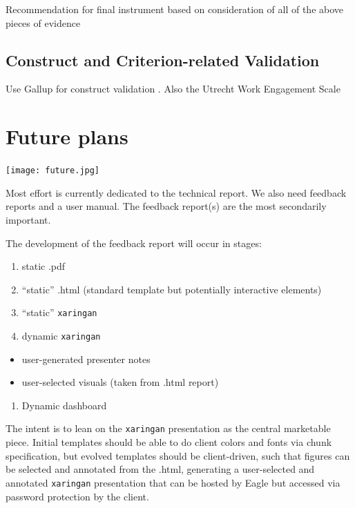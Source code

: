 \documentclass[
]{book}
\providecommand{\tightlist}{%
  \setlength{\itemsep}{0pt}\setlength{\parskip}{0pt}}
\begin{document}
Recommendation for final instrument based on consideration of all of the above pieces of evidence

\hypertarget{construct-and-criterion-related-validation}{%
\section{Construct and Criterion-related Validation}\label{construct-and-criterion-related-validation}}

Use Gallup for construct validation \citep{thackray_gallup_2005, harter_relationship_2013}. Also the Utrecht Work Engagement Scale \citep[UWES;][]{schaufeli_measurement_2002, schaufeli_defining_2010}

\hypertarget{future-plans}{%
\chapter{Future plans}\label{future-plans}}

\texttt{[image: future.jpg]}

Most effort is currently dedicated to the technical report. We also need feedback reports and a user manual. The feedback report(s) are the most secondarily important.

The development of the feedback report will occur in stages:

\begin{enumerate}
\def\labelenumi{\arabic{enumi}.}
\tightlist
\item
  static .pdf
\item
  ``static'' .html (standard template but potentially interactive elements)
\item
  ``static'' \texttt{xaringan} \citep{R-xaringan}
\item
  dynamic \texttt{xaringan}
\end{enumerate}

\begin{itemize}
\tightlist
\item
  user-generated presenter notes
\item
  user-selected visuals (taken from .html report)
\end{itemize}

\begin{enumerate}
\def\labelenumi{\arabic{enumi}.}
\setcounter{enumi}{4}
\tightlist
\item
  Dynamic dashboard
\end{enumerate}

The intent is to lean on the \texttt{xaringan} presentation as the central marketable piece. Initial templates should be able to do client colors and fonts via chunk specification, but evolved templates should be client-driven, such that figures can be selected and annotated from the .html, generating a user-selected and annotated \texttt{xaringan} presentation that can be hosted by Eagle but accessed via password protection by the client.
\end{document}
